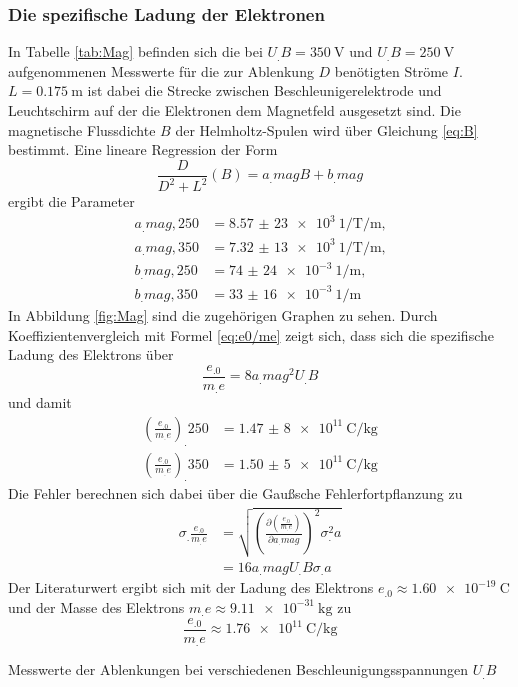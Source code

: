 \subsubsection{Die spezifische Ladung der Elektronen}
In Tabelle \ref{tab:Mag} befinden sich die bei $U_.B=\SI{350}{\volt}$ und $U_.B=\SI{250}{\volt}$ aufgenommenen Messwerte für die zur Ablenkung $D$ benötigten Ströme $I$.
$L=\SI{0,175}{\metre}$\cite{V501} ist dabei die Strecke zwischen Beschleunigerelektrode und Leuchtschirm auf der die Elektronen dem Magnetfeld ausgesetzt sind.
Die magnetische Flussdichte $B$ der Helmholtz-Spulen wird über Gleichung \eqref{eq:B} bestimmt.
Eine lineare Regression der Form \[\frac{D}{D^2+L^2}(B)=a_.{mag}B+b_.{mag}\] ergibt die Parameter
\begin{align*}
a_.{mag,250}&=\SI{8,57(23)e3}{1\per\tesla\per\metre}\text{,}\\
a_.{mag,350}&=\SI{7,32(13)e3}{1\per\tesla\per\metre}\text{,}\\
b_.{mag,250}&=\SI{74(24)e-3}{1\per\metre}\text{,}\\
b_.{mag,350}&=\SI{33(16)e-3}{1\per\metre}
\end{align*}
In Abbildung \ref{fig:Mag} sind die zugehörigen Graphen zu sehen.
Durch Koeffizientenvergleich mit Formel \eqref{eq:e0/me} zeigt sich, dass sich die spezifische Ladung des Elektrons über
\[
\frac{e_.0}{m_.e}=8a_.{mag}^2U_.B
\]
und damit 
\begin{align*}
\left(\frac{e_.0}{m_.e}\right)_.{250}&=\SI{1,47(8)e11}{\coulomb\per\kilogram}\\
\left(\frac{e_.0}{m_.e}\right)_.{350}&=\SI{1,50(5)e11}{\coulomb\per\kilogram}
\end{align*}
Die Fehler berechnen sich dabei über die Gaußsche Fehlerfortpflanzung zu
\begin{align*}
\sigma_.{\frac{e_.0}{m_.e}}&=\sqrt{\left(\frac{\partial\left(\frac{e_.0}{m_.e}\right)}{\partial a_.{mag}}\right)^2\sigma^2_.a}\\
                           &=16a_.{mag}U_.B\sigma_.a
\end{align*}
Der Literaturwert ergibt sich mit der Ladung des Elektrons $e_.0\approx\SI{1,60e-19}{\coulomb}$ und der Masse des Elektrons $m_.e\approx\SI{9,11e-31}{\kilogram}$ zu 
\[
\frac{e_.0}{m_.e}\approx\SI{1,76e11}{\coulomb\per\kilogram}
\]
\begin{table}
\centering
\caption{Messwerte der Ablenkungen bei verschiedenen Beschleunigungsspannungen $U_.B$}

\label{tab:Mag}
\end{table}
